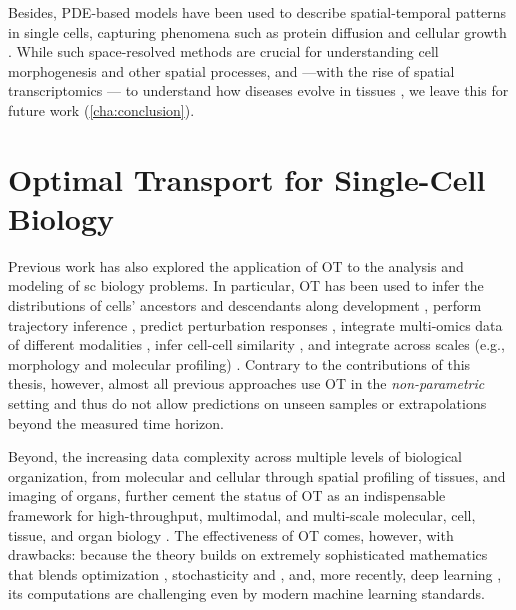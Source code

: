 Besides, \acrshort{PDE}-based models have been used to describe spatial-temporal patterns in single cells, capturing phenomena such as protein diffusion and cellular growth \citep{turing1990chemical, erban2004individual}. While such space-resolved methods are crucial for understanding cell morphogenesis and other spatial processes, and ---with the rise of spatial transcriptomics \citep{marx2021method}--- to understand how diseases evolve in tissues \citep{fischer2023modeling, ren2022identifying}, we leave this for future work (\cref{cha:conclusion}).


\section{Optimal Transport for Single-Cell Biology}
\label{sec:ot_for_biology}

Previous work has also explored the application of \acrlong{OT} to the analysis and modeling of \acrlong{sc} biology problems.
In particular, \acrshort{OT} has been used to infer the distributions of cells' ancestors and descendants along development \citep{schiebinger2019optimal}, perform trajectory inference \citep{bunne2022proximal, forrow2021lineageot, bunne2022recovering, lavenant2021towards, schiebinger2019optimal, tong2020trajectorynet, yang2020predicting, zhang2021optimal, chizat2022trajectory}, predict perturbation responses \citep{bunne2021learning, yang2018scalable, lubeck2022neural}, integrate multi-omics data of different modalities \citep{demetci2022scot}, infer cell-cell similarity \citep{huizing2022optimal}, and integrate across scales (e.g., morphology and molecular profiling) \citep{yang2021multi}. 
Contrary to the contributions of this thesis, however, almost all previous approaches use \acrshort{OT} in the \emph{non-parametric} setting and thus do not allow predictions on unseen samples or extrapolations beyond the measured time horizon.

Beyond, the increasing data complexity across multiple levels of biological organization, from molecular and cellular through spatial profiling of tissues, and imaging of organs, further cement the status of \acrshort{OT} as an indispensable framework for high-throughput, multimodal, and multi-scale molecular, cell, tissue, and organ biology \citep{moriel2021novosparc}. The effectiveness of \acrshort{OT} comes, however, with drawbacks: because the theory builds on extremely sophisticated mathematics that blends optimization \citep{cuturi2013sinkhorn, cuturi2022optimal}, stochasticity \citep{chizat2022trajectory, bunne2022recovering} and  \citep{bunne2022proximal}, and, more recently, deep learning \citep{tong2020trajectorynet, bunne2021learning, bunne2022supervised, yang2018scalable, lubeck2022neural, yang2021multi}, its computations are challenging even by modern machine learning standards.
